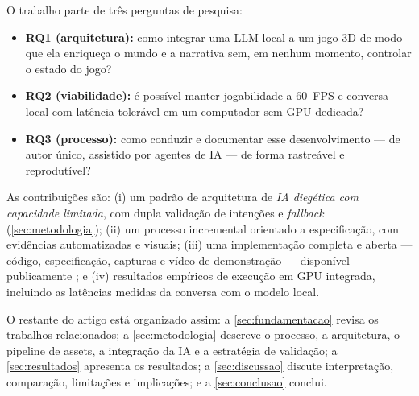 O trabalho parte de três perguntas de pesquisa:

\begin{itemize}
  \item \textbf{RQ1 (arquitetura):} como integrar uma LLM local a um jogo 3D de
  modo que ela enriqueça o mundo e a narrativa sem, em nenhum momento,
  controlar o estado do jogo?
  \item \textbf{RQ2 (viabilidade):} é possível manter jogabilidade a 60~FPS e
  conversa local com latência tolerável em um computador sem GPU dedicada?
  \item \textbf{RQ3 (processo):} como conduzir e documentar esse
  desenvolvimento --- de autor único, assistido por agentes de IA --- de forma
  rastreável e reprodutível?
\end{itemize}

As contribuições são: (i) um padrão de arquitetura de \emph{IA diegética com
capacidade limitada}, com dupla validação de intenções e \emph{fallback}
(\autoref{sec:metodologia}); (ii) um processo incremental orientado a
especificação, com evidências automatizadas e visuais; (iii) uma implementação
completa e aberta --- código, especificação, capturas e vídeo de demonstração
--- disponível publicamente \citep{lab404repo,lab404video}; e (iv) resultados
empíricos de execução em GPU integrada, incluindo as latências medidas da
conversa com o modelo local.

O restante do artigo está organizado assim: a
\autoref{sec:fundamentacao} revisa os trabalhos relacionados; a
\autoref{sec:metodologia} descreve o processo, a arquitetura, o pipeline de
assets, a integração da IA e a estratégia de validação; a
\autoref{sec:resultados} apresenta os resultados; a \autoref{sec:discussao}
discute interpretação, comparação, limitações e implicações; e a
\autoref{sec:conclusao} conclui.

